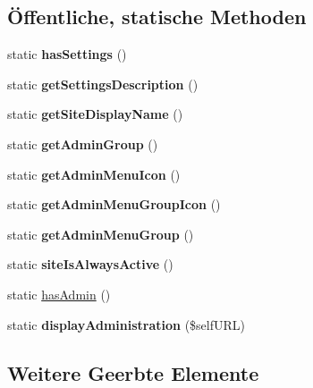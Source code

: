 \subsection*{Öffentliche, statische Methoden}
\begin{DoxyCompactItemize}
\item 
\mbox{\label{classsmsadmin_a37c18a65913b5d729be09fe095c3982d}} 
static {\bfseries has\+Settings} ()
\item 
\mbox{\label{classsmsadmin_acd788f29463a4e2b1e126e3a5d153774}} 
static {\bfseries get\+Settings\+Description} ()
\item 
\mbox{\label{classsmsadmin_ab99582734c494ceeea52f43ebfb040d2}} 
static {\bfseries get\+Site\+Display\+Name} ()
\item 
\mbox{\label{classsmsadmin_a4a656734247edda2b2c329b283677cee}} 
static {\bfseries get\+Admin\+Group} ()
\item 
\mbox{\label{classsmsadmin_a0472bf12a7a871b57c30cb3c4aa6f795}} 
static {\bfseries get\+Admin\+Menu\+Icon} ()
\item 
\mbox{\label{classsmsadmin_a2fcc807274b5e6495aae49c0791fdbc4}} 
static {\bfseries get\+Admin\+Menu\+Group\+Icon} ()
\item 
\mbox{\label{classsmsadmin_a17818d6532c1221b43e9d467a451c7fb}} 
static {\bfseries get\+Admin\+Menu\+Group} ()
\item 
\mbox{\label{classsmsadmin_a7566d873d7fd35ee7dfb031a700d5467}} 
static {\bfseries site\+Is\+Always\+Active} ()
\item 
static \mbox{\hyperlink{classsmsadmin_af032368d2459cf2d5afb8d504d678abd}{has\+Admin}} ()
\item 
\mbox{\label{classsmsadmin_aa7ff1f1093d0ec2d5a08efb3c72a361a}} 
static {\bfseries display\+Administration} (\$self\+U\+RL)
\end{DoxyCompactItemize}
\subsection*{Weitere Geerbte Elemente}


